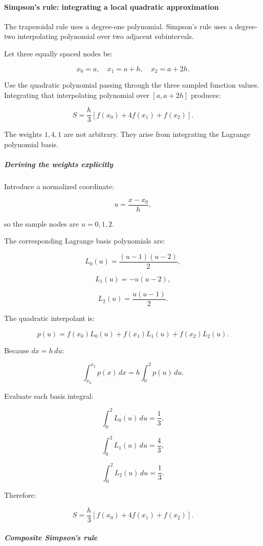 \paragraph{Simpson's rule: integrating a local quadratic approximation}\label{simpsons-rule-integrating-a-local-quadratic-approximation}

The trapezoidal rule uses a degree-one polynomial. Simpson's rule uses a degree-two interpolating polynomial over two adjacent subintervals.

Let three equally spaced nodes be:

\[
x_0=a,\quad x_1=a+h,\quad x_2=a+2h.
\]

Use the quadratic polynomial passing through the three sampled function values. Integrating that interpolating polynomial over \([a,a+2h]\) produces:

\[
\boxed{ S=\frac h3[f(x_0)+4f(x_1)+f(x_2)] }.
\]

The weights \(1,4,1\) are not arbitrary. They arise from integrating the Lagrange polynomial basis.

\subparagraph{Deriving the weights explicitly}\label{deriving-the-weights-explicitly}

Introduce a normalized coordinate:

\[
u=\frac{x-x_0}{h},
\]

so the sample nodes are \(u=0,1,2\).

The corresponding Lagrange basis polynomials are:

\[
L_0(u)=\frac{(u-1)(u-2)}2,
\]

\[
L_1(u)=-u(u-2),
\]

\[
L_2(u)=\frac{u(u-1)}2.
\]

The quadratic interpolant is:

\[
p(u)=f(x_0)L_0(u)+f(x_1)L_1(u)+f(x_2)L_2(u).
\]

Because \(dx=h\,du\):

\[
\int_{x_0}^{x_2}p(x)\,dx = h\int_0^2p(u)\,du.
\]

Evaluate each basis integral:

\[
\int_0^2L_0(u)\,du=\frac13,
\]

\[
\int_0^2L_1(u)\,du=\frac43,
\]

\[
\int_0^2L_2(u)\,du=\frac13.
\]

Therefore:

\[
S=\frac h3[f(x_0)+4f(x_1)+f(x_2)].
\]

\subparagraph{Composite Simpson's rule}\label{composite-simpsons-rule}

